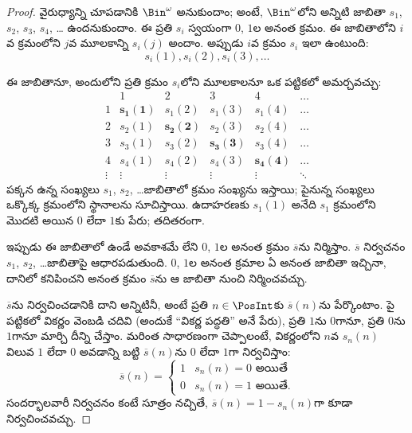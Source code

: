 \documentclass[../../../include/open-logic-section]{subfiles}
\begin{document}
\begin{proof}
వైరుధ్యాన్ని చూపడానికి $\Bin^\omega$  అనుకుందాం; అంటే,
$\Bin^\omega$లోని  అన్నిటి జాబితా $s_{1}$, $s_{2}$,
$s_{3}$, $s_{4}$, \dots{} ఉందనుకుందాం. ఈ ప్రతి $s_i$ స్వయంగా
$0$, $1$ల అనంత క్రమం. ఈ జాబితాలోని $i$వ క్రమంలోని $j$వ మూలకాన్ని
$s_i(j)$ అందాం. అప్పుడు $i$వ క్రమం $s_i$ ఇలా ఉంటుంది:
\[
s_i(1), s_i(2), s_i(3), \dots
\]

ఈ జాబితానూ, అందులోని ప్రతి క్రమం $s_i$లోని మూలకాలనూ ఒక పట్టికలో
అమర్చవచ్చు:
\[
\begin{array}{c|c|c|c|c|c}
& 1 & 2 & 3 & 4 & \dots \\\hline
1 & \mathbf{s_{1}(1)} & s_{1}(2) & s_{1}(3) & s_1(4) & \dots \\\hline
2 & s_{2}(1)& \mathbf{s_{2}(2)} & s_2(3) & s_2(4) & \dots \\\hline
3 & s_{3}(1)& s_{3}(2) & \mathbf{s_3(3)} & s_3(4) & \dots \\\hline
4 & s_{4}(1)& s_{4}(2) & s_4(3) & \mathbf{s_4(4)} & \dots \\\hline
\vdots & \vdots & \vdots & \vdots & \vdots & \mathbf{\ddots}
\end{array}
\]
పక్కన ఉన్న సంఖ్యలు $s_1$, $s_2$, \dots జాబితాలో క్రమం సంఖ్యను
ఇస్తాయి; పైనున్న సంఖ్యలు ఒక్కొక్క క్రమంలోని  స్థానాలను సూచిస్తాయి.
ఉదాహరణకు $s_{1}(1)$ అనేది $s_{1}$ క్రమంలోని మొదటి  అయిన
$0$ లేదా $1$కు పేరు; తదితరంగా.

ఇప్పుడు ఈ జాబితాలో ఉండే అవకాశమే లేని $0$, $1$ల అనంత క్రమం
$\overline{s}$ను నిర్మిస్తాం. $\overline{s}$ నిర్వచనం $s_1$, $s_2$,
\dots జాబితాపై ఆధారపడుతుంది. $0$, $1$ల అనంత క్రమాల ఏ అనంత జాబితా
ఇచ్చినా, దానిలో కనిపించని అనంత క్రమం $\overline{s}$ను
ఆ జాబితా నుంచి నిర్మించవచ్చు.

$\overline{s}$ను నిర్వచించడానికి దాని  అన్నిటినీ, అంటే
ప్రతి $n \in \PosInt$కు $\overline{s}(n)$ను పేర్కొంటాం. పై పట్టికలో
వికర్ణం వెంబడి చదివి (అందుకే ``వికర్ణ పద్ధతి'' అనే పేరు), ప్రతి
$1$ను $0$గానూ, ప్రతి $0$ను $1$గానూ మార్చి దీన్ని చేస్తాం. మరింత
సాధారణంగా చెప్పాలంటే, వికర్ణంలోని $n$వ  $s_n(n)$ విలువ $1$ లేదా $0$
అవడాన్ని బట్టి $\overline{s}(n)$ను $0$ లేదా $1$గా నిర్వచిస్తాం:
\[
\overline{s}(n) =
\begin{cases}
1 & \text{$s_{n}(n) = 0$ అయితే}\\
0 & \text{$s_{n}(n) = 1$ అయితే}.
\end{cases}
\]
సందర్భాలవారీ నిర్వచనం కంటే సూత్రం నచ్చితే,
$\overline{s}(n) = 1 - s_n(n)$గా కూడా నిర్వచించవచ్చు.


\end{proof}
\end{document}
